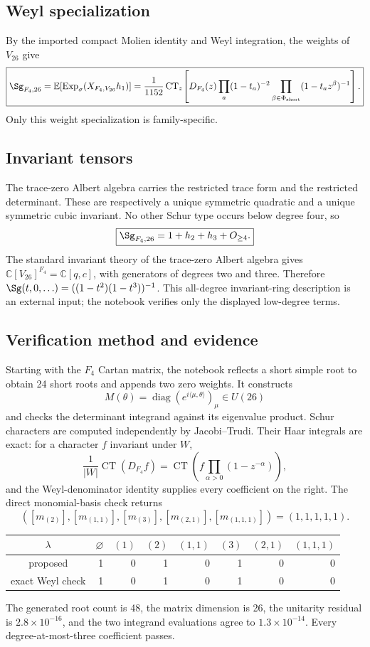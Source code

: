 \documentclass[10pt]{article}
\newcommand{\CT}{\operatorname{CT}}
\newcommand{\ExpS}{\operatorname{Exp}_{\sigma}}
\newcommand{\smgv}[2]{\mathbb E\!\left[\ExpS\!\left(X_{#1,#2}h_1\right)\right]}
\begin{document}
\subsection{Weyl specialization}
By the imported compact Molien identity and Weyl integration, the weights of
$V_{26}$ give
\[
\boxed{\Sg_{F_4,26}=\smgv{F_4}{V_{26}}
=\frac1{1152}\CT_z\!\left[D_{F_4}(z)\prod_a(1-t_a)^{-2}
\prod_{\beta\in\Phi_{\rm short}}(1-t_a z^\beta)^{-1}\right].}
\]
Only this weight specialization is family-specific.

\subsection{Invariant tensors}
The trace-zero Albert algebra carries the restricted trace form and the
restricted determinant.  These are respectively a unique symmetric quadratic
and a unique symmetric cubic invariant.  No other Schur type occurs below
degree four, so
\[
 \boxed{\Sg_{F_4,26}=1+h_2+h_3+O_{\ge4}.}
\]
The standard invariant theory of the trace-zero Albert algebra gives
$\mathbb C[V_{26}]^{F_4}=\mathbb C[q,c]$, with generators of degrees two and
three.  Therefore
$\Sg(t,0,\ldots)=((1-t^2)(1-t^3))^{-1}$.  This all-degree invariant-ring
description is an external input; the notebook verifies only the displayed
low-degree terms.

\subsection{Verification method and evidence}
Starting with the $F_4$ Cartan matrix, the notebook reflects a short simple
root to obtain 24 short roots and appends two zero weights.  It constructs
\[
 M(\theta)=\operatorname{diag}(e^{i\langle\mu,\theta\rangle})_{\mu}\in U(26)
\]
and checks the determinant integrand against its eigenvalue product.  Schur
characters are computed independently by Jacobi--Trudi.  Their Haar integrals
are exact: for a character $f$ invariant under $W$,
\[
 \frac1{|W|}\CT(D_{F_4}f)=\CT\left(f\prod_{\alpha>0}(1-z^{-\alpha})\right),
\]
and the Weyl-denominator identity supplies every coefficient on the right.
The direct monomial-basis check returns
\[
([m_{(2)}],[m_{(1,1)}],[m_{(3)}],[m_{(2,1)}],[m_{(1,1,1)}])
=(1,1,1,1,1).
\]

\begin{center}\small
\begin{tabular}{@{}c|rrrrrrr@{}}\toprule
$\lambda$&$\varnothing$&$(1)$&$(2)$&$(1,1)$&$(3)$&$(2,1)$&$(1,1,1)$\\\midrule
proposed&1&0&1&0&1&0&0\\
exact Weyl check&1&0&1&0&1&0&0\\\bottomrule
\end{tabular}
\end{center}
The generated root count is 48, the matrix dimension is 26, the unitarity
residual is $2.8\times10^{-16}$, and the two integrand evaluations agree to
$1.3\times10^{-14}$.  Every degree-at-most-three coefficient passes.
\end{document}
